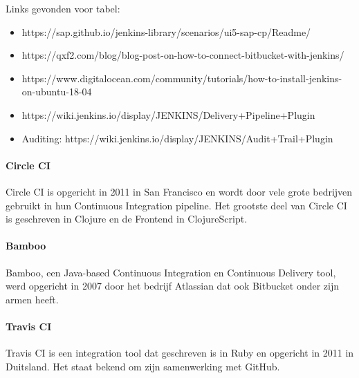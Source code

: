             Links gevonden voor tabel: 
            \begin{itemize}
                \item https://sap.github.io/jenkins-library/scenarios/ui5-sap-cp/Readme/
                \item https://qxf2.com/blog/blog-post-on-how-to-connect-bitbucket-with-jenkins/
                \item https://www.digitalocean.com/community/tutorials/how-to-install-jenkins-on-ubuntu-18-04
                \item https://wiki.jenkins.io/display/JENKINS/Delivery+Pipeline+Plugin
                \item Auditing: https://wiki.jenkins.io/display/JENKINS/Audit+Trail+Plugin
            \end{itemize}
            
            \paragraph{Circle CI}
            Circle CI is opgericht in 2011 in San Francisco en wordt door vele grote bedrijven gebruikt in hun Continuous Integration pipeline. Het grootste deel van Circle CI is geschreven in Clojure en de Frontend in ClojureScript. 

            \paragraph{Bamboo}
            Bamboo, een Java-based Continuous Integration en Continuous Delivery tool, werd opgericht in 2007 door het bedrijf Atlassian dat ook Bitbucket onder zijn armen heeft.
            
            \paragraph{Travis CI}
            Travis CI is een integration tool dat geschreven is in Ruby en opgericht in 2011 in Duitsland. Het staat bekend om zijn samenwerking met GitHub.
            
